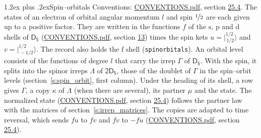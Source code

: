 \documentclass[10pt,a4paper]{article}
\makeatletter
\renewcommand\section{\@startsection{section}{1}{\z@}{-3ex plus -1ex minus -.2ex}%
  {1.2ex plus .2ex}{\normalfont\large\sffamily\bfseries\color{parttitle}}}
\numberwithin{equation}{section}
\newcommand{\grp}[1]{\mathsf{#1}}
\newcommand{\orbital}[1]{\mathrm{#1}}
\newcommand{\mult}{\kappa}
\newcommand{\intx}{\mu}
\newcommand{\jm}[2]{\bigl\lvert{}^{#1}_{\,#2}\bigr\rangle}
\makeatother
\begin{document}
\section{Spin--orbitals}\label{s:spin_orbitals}
Conventions: \href{../../CONVENTIONS.pdf}{CONVENTIONS.pdf}, section \href{../../CONVENTIONS.pdf\#conv.25.4}{25.4}.
\leavevmode\label{n:index.orbital.l}The states of an electron of orbital angular momentum $l$ and spin $\nicefrac{1}{2}$ are each given up to a positive factor. \label{n:local.spinor.uv}\label{n:local.function.f}They are written in the functions $f$ of the $\orbital{s}$, $\orbital{p}$ and $\orbital{d}$ shells of \href{../../../rotation/data/pdf/D5.pdf}{$\grp{D_{5}}$} (\href{../../CONVENTIONS.pdf}{CONVENTIONS.pdf}, section \href{../../../rotation/CONVENTIONS.pdf\#conv.13}{13}) times the spin kets $u = \jm{1/2}{1/2}$ and $v = \jm{1/2}{-1/2}$. The record also holds the $\orbital{f}$ shell (\texttt{spinorbitals}). An orbital level consists of the functions of degree $l$ that carry the irrep $\Gamma$ of \href{../../../rotation/data/pdf/D5.pdf}{$\grp{D_{5}}$}. With the spin, it splits into the spinor irreps $\Lambda$ of $\grp{2D_{5}}$, those of the doublet of $\Gamma$ in the spin--orbit levels (section~\ref{s:spin_orbit}, first column). \label{n:head.state}Under the heading of its shell, a row gives $\Gamma$, a copy $\mult$ of $\Lambda$ (when there are several), its partner $\intx$ and the state. The normalized state (\href{../../CONVENTIONS.pdf}{CONVENTIONS.pdf}, section \href{../../CONVENTIONS.pdf\#conv.25.4}{25.4}) follows the partner law with the matrices of section~\ref{s:irrep_matrices}. The copies are adapted to time reversal, which sends $f u$ to $f v$ and $f v$ to $-f u$ (\href{../../CONVENTIONS.pdf}{CONVENTIONS.pdf}, section \href{../../CONVENTIONS.pdf\#conv.25.4}{25.4}).
\end{document}
